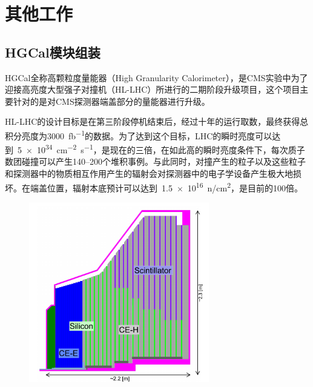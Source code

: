 
\chapter{其他工作}
\section{HGCal模块组装}

HGCal全称高颗粒度量能器（High Granularity Calorimeter），是CMS实验中为了迎接高亮度大型强子对撞机（HL-LHC）所进行的二期阶段升级项目，这个项目主要针对的是对CMS探测器端盖部分的量能器进行升级。

HL-LHC的设计目标是在第三阶段停机结束后，经过十年的运行取数，最终获得总积分亮度为3000~\si{fb^{-1}}的数据。为了达到这个目标，LHC的瞬时亮度可以达到~\num{5e34}~\si{\cm^{-2}\s^{-1}}，是现在的三倍，在如此高的瞬时亮度条件下，每次质子数团碰撞可以产生140--200个堆积事例。与此同时，对撞产生的粒子以及这些粒子和探测器中的物质相互作用产生的辐射会对探测器中的电子学设备产生极大地损坏。在端盖位置，辐射本底预计可以达到~\num{1.5e16}~\si{n/cm^{2}}，是目前的100倍。

\begin{figure}[!htbp]
    \centering
    \includegraphics[width=0.7\textwidth]{figures/chapter05/HGCal.pdf}
    \label{fig:c05f01}
\end{figure}

